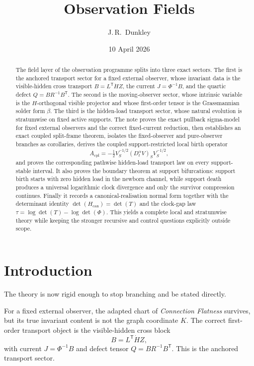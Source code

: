 \documentclass[11pt,a4paper]{article}
\title{\textbf{Observation Fields}}
\author{J.\,R.~Dunkley}
\date{10 April 2026}
\numberwithin{equation}{section}
\theoremstyle{thmcompact}
\theoremstyle{remark}
\begin{document}
\maketitle

\begin{abstract}
The field layer of the observation programme splits into three exact sectors. The first is the anchored transport sector for a fixed external observer, whose invariant data is the visible-hidden cross transport $B=L^{\mathsf T}\dot H Z$, the current $J=\Phi^{-1}B$, and the quartic defect $Q=BR^{-1}B^{\mathsf T}$. The second is the moving-observer sector, whose intrinsic variable is the $H$-orthogonal visible projector and whose first-order tensor is the Grassmannian solder form $\beta$. The third is the hidden-load transport sector, whose natural evolution is stratumwise on fixed active supports. The note proves the exact pullback sigma-model for fixed external observers and the correct fixed-current reduction, then establishes an exact coupled split-frame theorem, isolates the fixed-observer and pure-observer branches as corollaries, derives the coupled support-restricted local birth operator
\[
A_{\mathrm{cpl}}=-\tfrac12 V_S^{-1/2}(D_t^\alpha V)_S V_S^{-1/2},
\]
and proves the corresponding pathwise hidden-load transport law on every support-stable interval. It also proves the boundary theorem at support bifurcations: support birth starts with zero hidden load in the newborn channel, while support death produces a universal logarithmic clock divergence and only the survivor compression continues. Finally it records a canonical-realisation normal form together with the determinant identity $\det(H_{\mathrm{can}})=\det(T)$ and the clock-gap law $\tau=\log\det(T)-\log\det(\Phi)$. This yields a complete local and stratumwise theory while keeping the stronger recursive and control questions explicitly outside scope.
\end{abstract}

\section{Introduction}

The theory is now rigid enough to stop branching and be stated directly.

For a fixed external observer, the adapted chart of \emph{Connection Flatness} survives, but its true invariant content is not the graph coordinate $K$. The correct first-order transport object is the visible-hidden cross block
\[
B=L^{\mathsf T}\dot H Z,
\]
with current $J=\Phi^{-1}B$ and defect tensor $Q=BR^{-1}B^{\mathsf T}$. This is the anchored transport sector.
\end{document}
